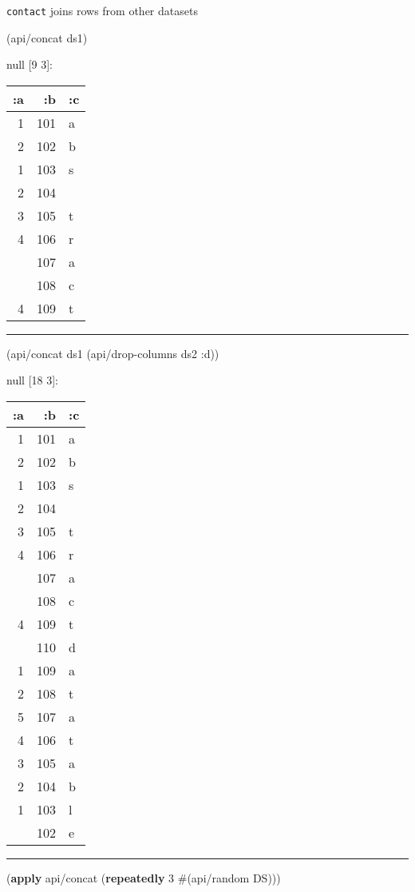 \documentclass[]{article}
\newenvironment{Shaded}{\begin{snugshade}}{\end{snugshade}}
\newcommand{\KeywordTok}[1]{\textcolor[rgb]{0.13,0.29,0.53}{\textbf{#1}}}
\newcommand{\DecValTok}[1]{\textcolor[rgb]{0.00,0.00,0.81}{#1}}
\newcommand{\AttributeTok}[1]{\textcolor[rgb]{0.77,0.63,0.00}{#1}}
\newcommand{\NormalTok}[1]{#1}
\begin{document}
\texttt{contact} joins rows from other datasets

\begin{Shaded}
\begin{Highlighting}[]
\NormalTok{(api/concat ds1)}
\end{Highlighting}
\end{Shaded}

null {[}9 3{]}:

\begin{longtable}[]{@{}rrl@{}}
\toprule
:a & :b & :c\tabularnewline
\midrule
\endhead
1 & 101 & a\tabularnewline
2 & 102 & b\tabularnewline
1 & 103 & s\tabularnewline
2 & 104 &\tabularnewline
3 & 105 & t\tabularnewline
4 & 106 & r\tabularnewline
& 107 & a\tabularnewline
& 108 & c\tabularnewline
4 & 109 & t\tabularnewline
\bottomrule
\end{longtable}

\begin{center}\rule{0.5\linewidth}{0.5pt}\end{center}

\begin{Shaded}
\begin{Highlighting}[]
\NormalTok{(api/concat ds1 (api/drop-columns ds2 }\AttributeTok{:d}\NormalTok{))}
\end{Highlighting}
\end{Shaded}

null {[}18 3{]}:

\begin{longtable}[]{@{}rrl@{}}
\toprule
:a & :b & :c\tabularnewline
\midrule
\endhead
1 & 101 & a\tabularnewline
2 & 102 & b\tabularnewline
1 & 103 & s\tabularnewline
2 & 104 &\tabularnewline
3 & 105 & t\tabularnewline
4 & 106 & r\tabularnewline
& 107 & a\tabularnewline
& 108 & c\tabularnewline
4 & 109 & t\tabularnewline
& 110 & d\tabularnewline
1 & 109 & a\tabularnewline
2 & 108 & t\tabularnewline
5 & 107 & a\tabularnewline
4 & 106 & t\tabularnewline
3 & 105 & a\tabularnewline
2 & 104 & b\tabularnewline
1 & 103 & l\tabularnewline
& 102 & e\tabularnewline
\bottomrule
\end{longtable}

\begin{center}\rule{0.5\linewidth}{0.5pt}\end{center}

\begin{Shaded}
\begin{Highlighting}[]
\NormalTok{(}\KeywordTok{apply}\NormalTok{ api/concat (}\KeywordTok{repeatedly} \DecValTok{3}\NormalTok{ #(api/random DS)))}
\end{Highlighting}
\end{Shaded}
\end{document}
